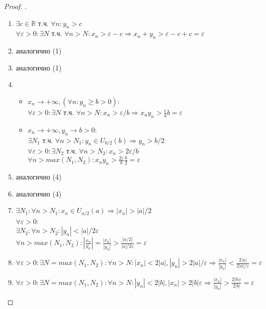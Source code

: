 \documentclass[12pt, a4]{article}
\renewcommand{\implies}{\Rightarrow}
\renewcommand{\epsilon}{\varepsilon}
\newcommand{\R}{\mathbb{R}}
\begin{document}
\begin{proof}.\\
\begin{enumerate}
    \item $\exists c \in \R$ т.ч. $\forall n: y_n > c$\\
          $\forall \epsilon > 0: \exists N$ т.ч. $\forall n > N: x_n > \epsilon - c \implies x_n + y_n > \epsilon - c + c = \epsilon$
    \item аналогично (1)
    \item аналогично (1)
    \item \begin{itemize}
        \item $x_n \to +\infty, (\forall n: y_n \geq b > 0):$\\
              $\forall \epsilon > 0: \exists N$ т.ч. $\forall n > N: x_n > \epsilon/b \implies x_n y_n > \frac{e}{b}b = \epsilon $
        \item $x_n \to +\infty, y_n \to b > 0:$\\
              $\exists N_1$ т.ч. $\forall n > N_1: y_n \in U_{b/2}(b) \implies y_n > b/2$\\
              $\forall \epsilon > 0: \exists N_2$ т.ч. $\forall n > N_2: x_n > 2\epsilon/b$\\
              $\forall n > max(N_1, N_2): x_n y_n > \frac{2\epsilon}{b}\frac{b}{2} = \epsilon$
    \end{itemize}
    \item аналогично (4)
    \item аналогично (4)
    \item $\exists N_1: \forall n > N_1: x_n \in U_{a/2}(a) \implies |x_n| > |a|/2$\\
          $\forall \epsilon > 0$:\\
          $\exists N_2: \forall n > N_2: |y_n| < |a|/2\epsilon$\\
          $\forall n > max(N_1,N_2): |\frac{x_n}{y_n}|=\frac{|x_n|}{|y_n|} > \frac{|a/2|}{|a|/2\epsilon} = \epsilon$
    \item $\forall \epsilon > 0: \exists N = max(N_1, N_2): \forall n > N: |x_n| < 2|a|, |y_n|>2|a|/\epsilon \implies \frac{|x_n|}{|y_n|} < \frac{2|a|}{2|a|/\epsilon} = \epsilon$
    \item $\forall \epsilon > 0: \exists N = max(N_1, N_2): \forall n > N: |y_n| < 2|b|, |x_n|>2|b|\epsilon \implies \frac{|x_n|}{|y_n|} > \frac{2|b|\epsilon}{2|b|} = \epsilon$
\end{enumerate}
\end{proof}
\end{document}

